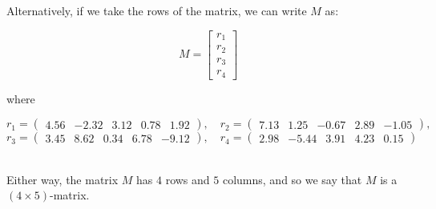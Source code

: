 \documentclass{ximera}
\begin{document}
\begin{example}
Alternatively, if we take the rows of the matrix, we can write $M$ as:

\[
M =
\left[\begin{array}{c}
  r_1 \\
  r_2 \\
  r_3 \\
  r_4
\end{array}
\right]
\]

where

\[
r_1 = \begin{pmatrix} 4.56 & -2.32 & 3.12 & 0.78 & 1.92 \end{pmatrix}, \quad
r_2 = \begin{pmatrix} 7.13 & 1.25 & -0.67 & 2.89 & -1.05 \end{pmatrix}, \quad \]
\[
r_3 = \begin{pmatrix} 3.45 & 8.62 & 0.34 & 6.78 & -9.12 \end{pmatrix}, \quad
r_4 = \begin{pmatrix} 2.98 & -5.44 & 3.91 & 4.23 & 0.15 \end{pmatrix}
\]\


\end{example}

Either way, the matrix $M$ has $4$ rows and $5$ columns, and so we say that $M$ is a $(4\times 5)$-matrix.
\end{document}
